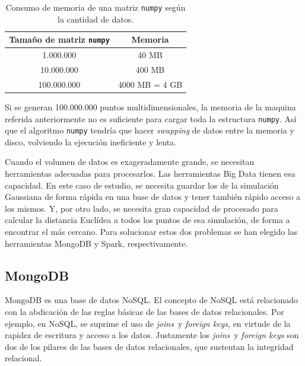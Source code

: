 \documentclass[11pt,spanish,listoffigures,listoftables]{tfgetsinf}
\begin{document}
        \begin{table}[H]
             \centering
             \begin{tabular}{|c|c|} 
                 \hline
                 Tamaño de matriz {\tt numpy} & Memoria \\ [0.5ex] 
                 \hline\hline
                 1.000.000 & 40 MB \\ 
                 \hline
                 10.000.000 & 400 MB \\ 
                 \hline
                 100.000.000 & 4000 MB = 4 GB \\ 
                 \hline
            \end{tabular}
            \caption{Consumo de memoria de una matriz {\tt numpy} según la cantidad de datos.}
            \label{table:memory}
        \end{table}
        
        Si se generan 100.000.000 puntos multidimensionales, la memoria de la maquina referida anteriormente no es suficiente para cargar toda la estructura {\tt numpy}. Así que el algoritmo {\tt numpy} tendría que hacer {\em swapping} de datos entre la memoria y disco, volviendo la ejecución ineficiente y lenta. 
        
        Cuando el volumen de datos es exageradamente grande, se necesitan herramientas adecuadas para procesarlos. Las herramientas Big Data tienen esa capacidad. En este caso de estudio, se necesita guardar los de la simulación Gaussiana de forma rápida en una base de datos y tener también rápido acceso a los mismos. Y, por otro lado, se necesita gran capacidad de procesado para calcular la distancia Euclídea a todos los puntos de esa simulación, de forma a encontrar el más cercano. Para solucionar estos dos problemas se han elegido las herramientas MongoDB y Spark, respectivamente.
        
        \subsection{MongoDB}
        MongoDB es una base de datos NoSQL. El concepto de NoSQL está relacionado con la abdicación de las reglas básicas de las bases de datos relacionales. Por ejemplo, en NoSQL, se suprime el uso de {\em joins} y {\em foreign keys}, en virtude de la rapidez de escritura y acceso a los datos. Justamente los {\em joins} y {\em foreign keys} son dos de los pilares de las bases de datos relacionales, que sustentan la integridad relacional. 
        
\end{document}

